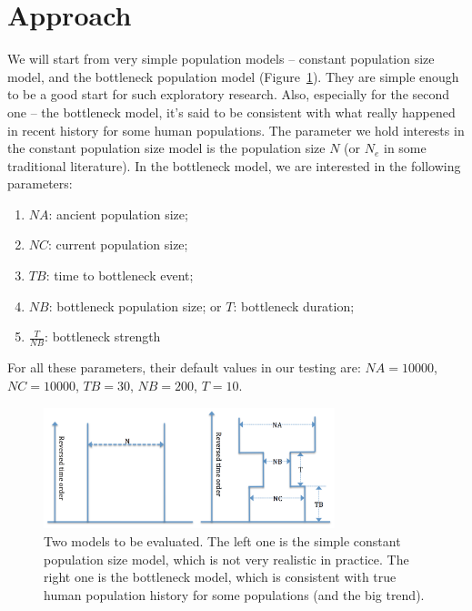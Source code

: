 \documentclass{bioinfo}
\begin{document}
\section{Approach}

We will start from very simple population models -- constant population size model, and the bottleneck population model (Figure~\ref{fig:model}). They are simple enough to be a good start for such exploratory research. Also, especially for the second one -- the bottleneck model, it's said to be consistent with what really happened in recent history for some human populations. The parameter we hold interests in the constant population size model is the population size $N$ (or $N_e$ in some traditional literature). In the bottleneck model, we are interested in the following parameters:

\begin{enumerate}
\item $NA$: ancient population size;
\item $NC$: current population size;
\item $TB$: time to bottleneck event;
\item $NB$: bottleneck population size; or $T$: bottleneck duration;
\item $\frac{T}{NB}$: bottleneck strength
\end{enumerate}

For all these parameters, their default values in our testing are: $NA=10000$, $NC=10000$, $TB=30$, $NB=200$, $T=10$.

\begin{figure}[h]
\centerline{\includegraphics[width=240pt, height=100pt]{model}}
\caption{Two models to be evaluated. The left one is the simple constant population size model, which is not very realistic in practice. The right one is the bottleneck model, which is consistent with true human population history for some populations (and the big trend).}\label{fig:model}
\end{figure}
\end{document}
